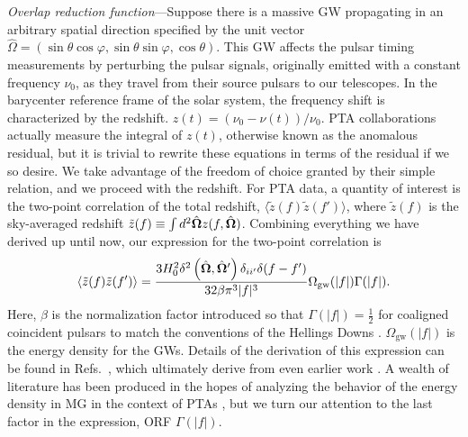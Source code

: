 \documentclass[prd,twocolumn,aps,psfig,nofootinbib,nobibnotes,superscriptaddress,preprintnumbers,times]{revtex4-2}
\begin{document}

\textit{Overlap reduction function}---Suppose there is a massive GW propagating in an arbitrary spatial direction specified by the unit vector $\hat{\Omega} = (                     \sin\theta \cos\varphi,
                        \sin\theta \sin\varphi,
                        \cos\theta)$.
This GW affects the pulsar timing measurements by perturbing the pulsar signals, originally emitted with a constant frequency $\nu_0$, as they travel from their source pulsars to our telescopes. In the barycenter reference frame of the solar system, the frequency shift is characterized by the redshift.
$z(t) = (\nu_0 - \nu(t))/\nu_0$.
PTA collaborations actually measure the integral of $z(t)$, otherwise known as the anomalous residual, but it is trivial to rewrite these equations in terms of the residual if we so desire. We take advantage of the freedom of choice granted by their simple relation, and we proceed with the redshift. For PTA data, a quantity of interest is the two-point correlation of the total redshift, $\langle \tilde{z}(f) \tilde{z}(f') \rangle$, where $\tilde{z}(f)$ is the sky-averaged redshift $\tilde{z}(f) \equiv \int d^2\hat{\bf \Omega} z(f, \hat{\bf \Omega})$. Combining everything we have derived up until now, our expression for the two-point correlation is
\begin{equation}\label{eqn:two_point_z}
    \langle \tilde{z}(f) \tilde{z}(f') \rangle = \frac{3H_0^2\delta^2\left(\hat{\bf \Omega} , \hat{\bf \Omega}'\right)\delta_{ii'}\delta(f - f')}{32 \beta \pi^3|f|^3}\Omega_{\text{gw}}(|f|) \Gamma(|f|).
\end{equation}
Here, $\beta$ is the normalization factor introduced so that $\Gamma(|f|) = \frac{1}{2}$ for coaligned coincident pulsars to match the conventions of the Hellings Downs \cite{Romano:2023zhb}. $\Omega_{\text{gw}}(|f|)$ is the energy density for the GWs. Details of the derivation of this expression can be found in Refs.\ \cite{Anholm:2008wy, Liang:2021bct}, which ultimately derive from even earlier work \cite{Detweiler:1979wn, Estabrook:1975jtn, Kaufmann:1970}. A wealth of literature has been produced in the hopes of analyzing the behavior of the energy density in MG in the context of PTAs \cite{Choi:2023tun, Wu:2023rib, Kenjale:2024rsc, He:2021bqm}, but we turn our attention to the last factor in the expression, ORF $\Gamma(|f|)$. 
\end{document}
